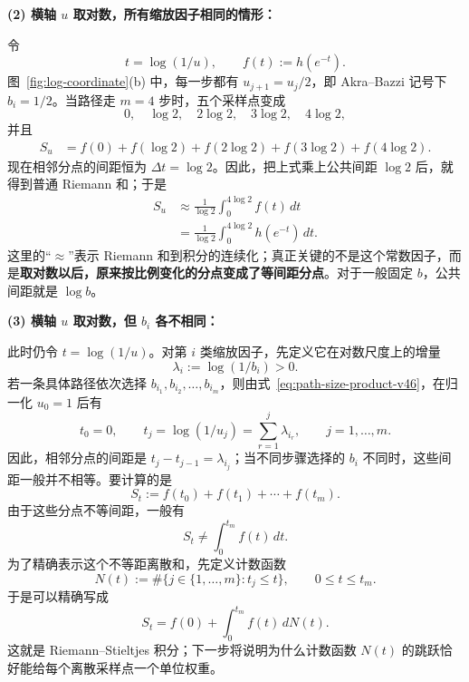 \documentclass[11pt,a4paper]{article}
\begin{document}
\noindent\textbf{(2) 横轴 $u$ 取对数，所有缩放因子相同的情形：}

令
\begin{equation}
t=\log(1/u),
\qquad
f(t):=h(e^{-t}).
\label{eq:log-transform-example-v45}
\end{equation}
图~\ref{fig:log-coordinate}(b) 中，每一步都有 $u_{j+1}=u_j/2$，即 Akra--Bazzi 记号下 $b_i=1/2$。当路径走 $m=4$ 步时，五个采样点变成
\[
0,\quad \log 2,\quad 2\log 2,\quad 3\log 2,\quad 4\log 2,
\]
并且
\begin{align}
S_u
&=f(0)+f(\log 2)+f(2\log 2)+f(3\log 2)+f(4\log 2).
\label{eq:sum-equal-log-samples-v45}
\end{align}
现在相邻分点的间距恒为 $\Delta t=\log 2$。因此，把上式乘上公共间距 $\log 2$ 后，就得到普通 Riemann 和；于是
\begin{align}
S_u
&\approx \frac{1}{\log 2}
\int_{0}^{4\log 2} f(t)\,dt \\
&=\frac{1}{\log 2}
\int_{0}^{4\log 2} h(e^{-t})\,dt.
\label{eq:fixed-b-riemann-v45}
\end{align}
这里的“$\approx$”表示 Riemann 和到积分的连续化；真正关键的不是这个常数因子，而是\textbf{取对数以后，原来按比例变化的分点变成了等间距分点}。对于一般固定 $b$，公共间距就是 $\log b$。

\noindent\textbf{(3) 横轴 $u$ 取对数，但 $b_i$ 各不相同：}

此时仍令 $t=\log(1/u)$。对第 $i$ 类缩放因子，先定义它在对数尺度上的增量
\begin{equation}
\lambda_i:=\log(1/b_i)>0.
\label{eq:lambda-i-v46}
\end{equation}
若一条具体路径依次选择 $b_{i_1},b_{i_2},\ldots,b_{i_m}$，则由式~\eqref{eq:path-size-product-v46}，在归一化 $u_0=1$ 后有
\begin{equation}
t_0=0,\qquad
t_j=\log(1/u_j)=\sum_{r=1}^{j}\lambda_{i_r},\qquad j=1,\ldots,m.
\label{eq:tj-from-bi-v46}
\end{equation}
因此，相邻分点的间距是 $t_j-t_{j-1}=\lambda_{i_j}$；当不同步骤选择的 $b_i$ 不同时，这些间距一般并不相等。要计算的是
\begin{equation}
S_t
:=f(t_0)+f(t_1)+\cdots+f(t_m).
\label{eq:unequal-bi-discrete-sum-v45}
\end{equation}
由于这些分点不等间距，一般有
\begin{equation}
S_t
\neq
\int_{0}^{t_m} f(t)\,dt.
\label{eq:unequal-bi-not-riemann-v45}
\end{equation}
为了精确表示这个不等距离散和，先定义计数函数
\begin{equation}
N(t):=\#\{j\in\{1,\ldots,m\}:t_j\le t\},\qquad 0\le t\le t_m.
\label{eq:preview-counting-function-v46}
\end{equation}
于是可以精确写成
\begin{equation}
S_t
=f(0)+\int_{0}^{t_m} f(t)\,dN(t).
\label{eq:unequal-bi-stieltjes-preview-v45}
\end{equation}
这就是 Riemann--Stieltjes 积分；下一步将说明为什么计数函数 $N(t)$ 的跳跃恰好能给每个离散采样点一个单位权重。
\end{document}
